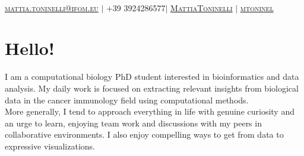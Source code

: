 \documentclass[]{resume-openfont}
\begin{document}
\newcommand{\yourEmail}{mattia.toninelli@ifom.eu}
\newcommand{\yourPhone}{+39 3924286577}
\newcommand{\githubUserName}{mtoninel}
\newcommand{\linkedInUserName}{MattiaToninelli}


\begin{center}
    \Huge \scshape {}  \\ \vspace{7pt}
    \small \href{mailto:\yourEmail}{ {\yourEmail}}  $|$   \yourPhone $|$ 
    \href{https://www.linkedin.com/in/mattia-toninelli-890134231/}{{ \linkedInUserName}} $|$
    \href{https://github.com/mtoninel}{ {\githubUserName}} 
\end{center}

\section{Hello!}
I am a computational biology PhD student interested in bioinformatics and data analysis. My daily work is focused on extracting relevant insights from biological data in the cancer immunology field using computational methods.\\
More generally, I tend to approach everything in life with genuine curiosity and an urge to learn, enjoying team work and discussions with my peers in collaborative environments. I also enjoy compelling ways to get from data to expressive visualizations.
\end{document}

